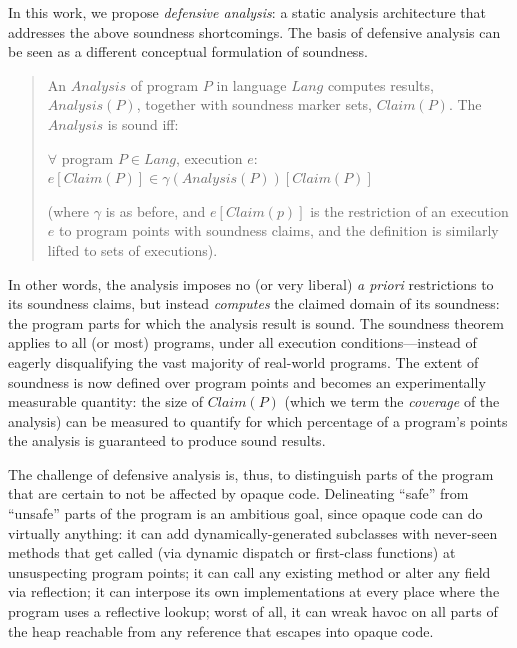 In this work, we propose \emph{defensive analysis}: a static
analysis architecture that addresses the above soundness
shortcomings. The basis of defensive analysis can be seen as a different conceptual
formulation of soundness.

\begin{quote}
  An \(Analysis\) of program \(P\) in language \(Lang\) computes
  results, \(Analysis(P)\), together with soundness marker sets,
  \(Claim(P)\). The \(Analysis\) is sound iff:
  
  \tab \tab \(\forall\) program \(P \in Lang\), execution \(e\): \(e[Claim(P)] \in \gamma(Analysis(P))[Claim(P)]\)
  
  (where \(\gamma\) is as before, and \(e[Claim(p)]\) is the restriction of an execution \(e\) to program points with soundness claims, and the definition is similarly lifted to sets of executions).
\end{quote}

\noindent In other words, the analysis imposes no (or very liberal)
\emph{a priori} restrictions to its soundness claims, but instead
\emph{computes} the claimed domain of its soundness: the program parts
for which the analysis result is sound. The soundness theorem applies
to all (or most) programs, under all execution conditions---instead of
eagerly disqualifying the vast majority of real-world programs. The
extent of soundness is now defined over program points and becomes an
experimentally measurable quantity: the size of \(Claim(P)\) (which we
term the \emph{coverage} of the analysis) can be measured to quantify
for which percentage of a program's points the analysis is guaranteed
to produce sound results.

The challenge of defensive analysis is, thus, to distinguish parts of
the program that are certain to not be affected by opaque
code. Delineating ``safe'' from ``unsafe'' parts of the program is an
ambitious goal, since opaque code can do virtually anything: it can
add dynamically-generated subclasses with never-seen methods that get
called (via dynamic dispatch or first-class functions) at unsuspecting
program points; it can call any existing method or alter any field via
reflection; it can interpose its own implementations at every place
where the program uses a reflective lookup; worst of all, it can wreak
havoc on all parts of the heap reachable from any reference that
escapes into opaque code.


